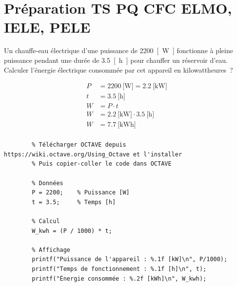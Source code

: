 \documentclass[a4paper,11pt,answers,addpoints]{exam}
\begin{document}
	
	
	\unframedsolutions
	\pointsinmargin
	\bracketedpoints
	\section*{Préparation TS PQ CFC ELMO, IELE, PELE}
	\begin{questions}

\question[3] Un chauffe-eau électrique d'une puissance de \qty{2200}{[\watt]} fonctionne à pleine puissance pendant une durée de \qty{3,5}{[\hour]} pour chauffer un réservoir d'eau. Calculer l'énergie électrique consommée par cet appareil en kilowattheures~?

\begin{solution}
	\begin{align*}
		P &= \qty{2200}{[\watt]} = \qty{2,2}{[\kilo\watt]} \\[6pt]
		t &= \qty{3,5}{[\hour]} \\[6pt]
		W &= P \cdot t \\[6pt]
		W &= \qty{2,2}{[\kilo\watt]} \cdot \qty{3,5}{[\hour]} \\[6pt]
		W &= \qty{7,7}{[\kilo\watt\hour]} \\[6pt]
	\end{align*}
	
	\begin{verbatim}
		% Télécharger OCTAVE depuis https://wiki.octave.org/Using_Octave et l'installer
		% Puis copier-coller le code dans OCTAVE
		
		% Données
		P = 2200;    % Puissance [W]
		t = 3.5;     % Temps [h]
		
		% Calcul
		W_kwh = (P / 1000) * t;
		
		% Affichage
		printf("Puissance de l'appareil : %.1f [kW]\n", P/1000);
		printf("Temps de fonctionnement : %.1f [h]\n", t);
		printf("Énergie consommée : %.2f [kWh]\n", W_kwh);
	\end{verbatim}
\end{solution}
\end{questions}
\end{document}
